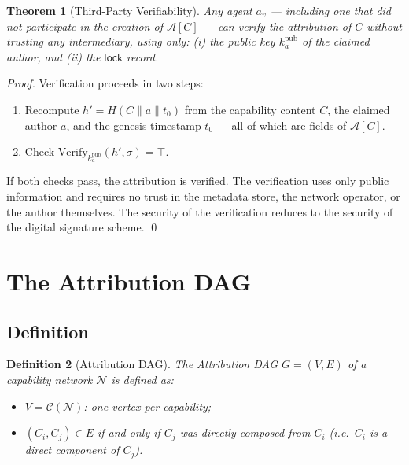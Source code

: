 \documentclass[12pt]{article}
\newtheorem{theorem}{Theorem}
\newtheorem{definition}[theorem]{Definition}
\newcommand{\ATTR}{\mathcal{A}}
\newcommand{\LOCK}{\mathsf{lock}}
\begin{document}
\begin{theorem}[Third-Party Verifiability]
  Any agent $a_v$ — including one that did not participate in the creation of
  $\ATTR[C]$ — can verify the attribution of $C$ without trusting any
  intermediary, using only: (i) the public key $k_a^{\text{pub}}$ of the claimed
  author, and (ii) the $\LOCK$ record.
\end{theorem}

\begin{proof}
  Verification proceeds in two steps:
  \begin{enumerate}[label=(\roman*)]
    \item Recompute $h' = H(C \| a \| t_0)$ from the capability content $C$,
      the claimed author $a$, and the genesis timestamp $t_0$ — all of which
      are fields of $\ATTR[C]$.
    \item Check $\text{Verify}_{k_a^{\text{pub}}}(h', \sigma) = \top$.
  \end{enumerate}
  If both checks pass, the attribution is verified.  The verification uses only
  public information and requires no trust in the metadata store, the network
  operator, or the author themselves.  The security of the verification reduces
  to the security of the digital signature scheme. \qed
\end{proof}

\section{The Attribution DAG}
\label{sec:dag}

\subsection{Definition}

\begin{definition}[Attribution DAG]
  The \emph{Attribution DAG} $G = (V, E)$ of a capability network $\mathcal{N}$
  is defined as:
  \begin{itemize}[leftmargin=*]
    \item $V = \mathcal{C}(\mathcal{N})$: one vertex per capability;
    \item $(C_i, C_j) \in E$ if and only if $C_j$ was directly composed from
      $C_i$ (i.e.\ $C_i$ is a direct component of $C_j$).
  \end{itemize}
\end{definition}
\end{document}
